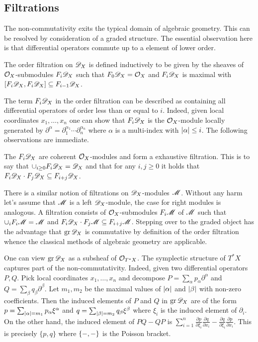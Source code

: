 \subsection{Filtrations}
The non-commutativity exits the typical domain of algebraic geometry.
This can be resolved by consideration of a graded structure.
The essential observation here is that differential operators commute up to a element of lower order.
\begin{definition}
  The order filtration on $\mathscr{D}_X$ is defined inductively to be given by the sheaves of $\mathcal{O}_X$-submodules $F_i \mathscr{D}_X$ such that $F_0\mathscr{D}_X = \mathcal{O}_X$ and $F_i\mathscr{D}_X$ is maximal with $[F_i\mathscr{D}_X, F_i \mathscr{D}_X] \subseteq F_{i-1}\mathscr{D}_X$.
\end{definition}
The term $F_i \mathscr{D}_X$ in the order filtration can be described as containing all differential operators of order less than or equal to $i$.
Indeed, given local coordinates $x_1,\ldots, x_n$ one can show that $F_i\mathscr{D}_X$ is the $\mathcal{O}_X$-module locally generated by $\partial^\alpha = \partial_1^{\alpha_1}\cdots \partial_n^{\alpha_n}$ where $\alpha$ is a multi-index with $\vert \alpha \vert\leq i$.
The following observations are immediate.
\begin{lemma}
  The $F_i\mathscr{D}_X$ are coherent $\mathcal{O}_X$-modules and form a exhaustive filtration. This is to say that $\cup_{i\geq 0}F_i\mathscr{D}_X = \mathscr{D}_X$
  and that for any $i,j\geq 0$ it holds that $F_i\mathscr{D}_X \cdot F_j \mathscr{D}_X \subseteq F_{i+j}\mathscr{D}_X$.
\end{lemma}
There is a similar notion of filtrations on $\mathscr{D}_X$-modules $\mathscr{M}$.
Without any harm let's assume that $\mathscr{M}$ is a left $\mathscr{D}_X$-module, the case for right modules is analogous.
A filtration consists of $\mathcal{O}_X$-submodules $F_i\mathscr{M}$ of $\mathscr{M}$ such that $\cup_i F_i \mathscr{M} = \mathscr{M}$ and $F_i\mathscr{D}_X \cdot F_j\mathscr{M} \subseteq F_{i+j}\mathscr{M}$.
Stepping over to the graded object has the advantage that $\operatorname{gr} \mathscr{D}_X$ is commutative by definition of the order filtration whence the classical methods of algebraic geometry are applicable.

One can view $\operatorname{gr}\mathscr{D}_X$ as a subsheaf of $\mathcal{O}_{T^*X}$.
The symplectic structure of $T^* X$ captures part of the non-commutativity.
Indeed, given two differential operators $P, Q$.
Pick local coordinates $x_1,\ldots, x_n$ and decompose $P = \sum_{\alpha} p_\alpha \partial^\alpha $ and $Q = \sum_{\beta} q_\beta \partial^\beta$.
Let $m_1,m_2$ be the maximal values of $\vert \alpha \vert$ and $\vert \beta \vert$ with non-zero coefficients.
Then the induced elements of $P$ and $Q$ in $\operatorname{gr} \mathscr{D}_X$ are of the form $p = \sum_{\vert \alpha \vert = m_1} p_\alpha \xi^\alpha$ and $q = \sum_{\vert \beta \vert = m_2}q_\beta \xi^\beta $ where $\xi_i$ is the induced element of $\partial_i$.
On the other hand, the induced element of $PQ - QP$ is $\sum_{i=1}^n\frac{\partial p}{\partial \xi_i}\frac{\partial q}{\partial x_i} - \frac{\partial q}{\partial \xi_i}\frac{\partial p}{\partial x_i}$.
This is precisely $\{p,q\}$ where $\{{-},{-}\}$ is the Poisson bracket.

